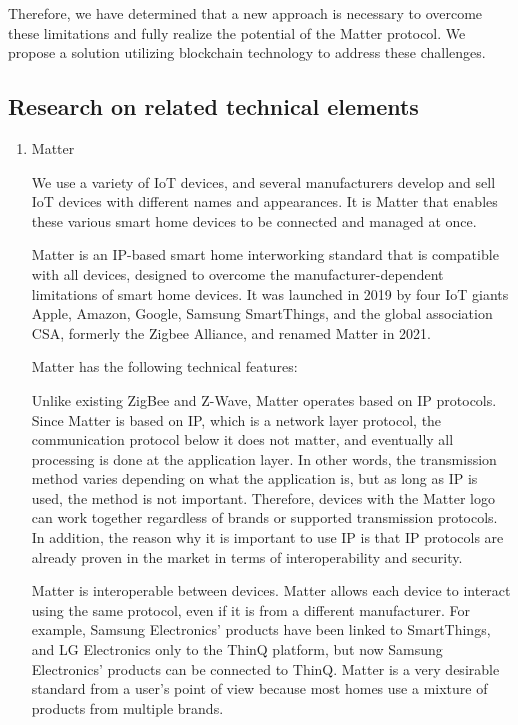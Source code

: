 \documentclass[conference]{IEEEtran}
\begin{document}
Therefore, we have determined that a new approach is necessary to overcome these
limitations and fully realize the potential of the Matter protocol. We propose
a solution utilizing blockchain technology to address these challenges.

\subsection{Research on related technical elements}

\begin{enumerate}[itemsep=2ex, parsep=1ex]
	\item Matter
	      	      	      
	      We use a variety of IoT devices, and several manufacturers develop and sell
	      IoT devices with different names and appearances. It is Matter that
	      enables these various smart home devices to be connected and managed at
	      once.
	      	      	      
	      Matter is an IP-based smart home interworking standard that is compatible
	      with all devices, designed to overcome the manufacturer-dependent limitations
	      of smart home devices. It was launched in 2019 by four IoT giants Apple, Amazon,
	      Google, Samsung SmartThings, and the global association CSA, formerly the Zigbee
	      Alliance, and renamed Matter in 2021.
	      	      	      
	      Matter has the following technical features:
	      	      	      
	      Unlike existing ZigBee and Z-Wave, Matter operates based on IP protocols. Since
	      Matter is based on IP, which is a network layer protocol, the communication
	      protocol below it does not matter, and eventually all processing is done
	      at the application layer. In other words, the transmission method varies
	      depending on what the application is, but as long as IP is used, the
	      method is not important. Therefore, devices with the Matter logo can work
	      together regardless of brands or supported transmission protocols. In addition,
	      the reason why it is important to use IP is that IP protocols are already
	      proven in the market in terms of interoperability and security.
	      	      	      
	      Matter is interoperable between devices. Matter allows each device to interact
	      using the same protocol, even if it is from a different manufacturer. For example,
	      Samsung Electronics' products have been linked to SmartThings, and LG
	      Electronics only to the ThinQ platform, but now Samsung Electronics'
	      products can be connected to ThinQ. Matter is a very desirable standard from
	      a user's point of view because most homes use a mixture of products from multiple
	      brands.
	      	      	      

\end{enumerate}
\end{document}
